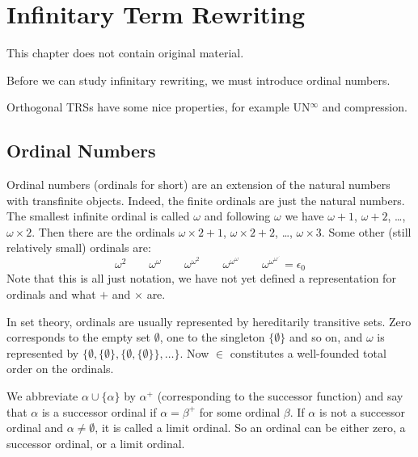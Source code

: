 \chapter{Infinitary Term Rewriting}\label{chap:rewriting}

This chapter does not contain original material.

Before we can study infinitary rewriting, we must introduce ordinal numbers.

Orthogonal TRSs have some nice properties, for example UN$^{\infty}$ and
compression.



\section{Ordinal Numbers}


Ordinal numbers (ordinals for short) are an extension of the natural numbers
with transfinite objects. Indeed, the finite ordinals are just the natural
numbers. The smallest infinite ordinal is called $\omega$ and following
$\omega$ we have $\omega + 1$, $\omega + 2$, \ldots, $\omega \times 2$. Then
there are the ordinals $\omega \times 2 + 1$, $\omega \times 2 + 2$, \ldots,
$\omega \times 3$. Some other (still relatively small) ordinals are:
\begin{displaymath}
  \omega^2 \qquad
  \omega^\omega \qquad
  \omega^{\omega^2} \qquad
  \omega^{\omega^\omega} \qquad
  \omega^{\omega^{\omega^{\iddots}}} = \epsilon_0 %
\end{displaymath}
Note that this is all just notation, we have not yet defined a representation
for ordinals and what $+$ and $\times$ are.

In set theory, ordinals are usually represented by hereditarily transitive
sets. Zero corresponds to the empty set $\emptyset$, one to the singleton $\{
\emptyset \}$ and so on, and $\omega$ is represented by $\{ \emptyset, \{
\emptyset \}, \{ \emptyset, \{ \emptyset \} \} , \ldots \}$. Now $\in$
constitutes a well-founded total order on the ordinals.

We abbreviate $\alpha \cup \{ \alpha \}$ by $\alpha^+$ (corresponding to the
successor function) and say that $\alpha$ is a successor ordinal if $\alpha =
\beta^+$ for some ordinal $\beta$. If $\alpha$ is not a successor ordinal and
$\alpha \neq \emptyset$, it is called a limit ordinal. So an ordinal can
be either zero, a successor ordinal, or a limit ordinal.

